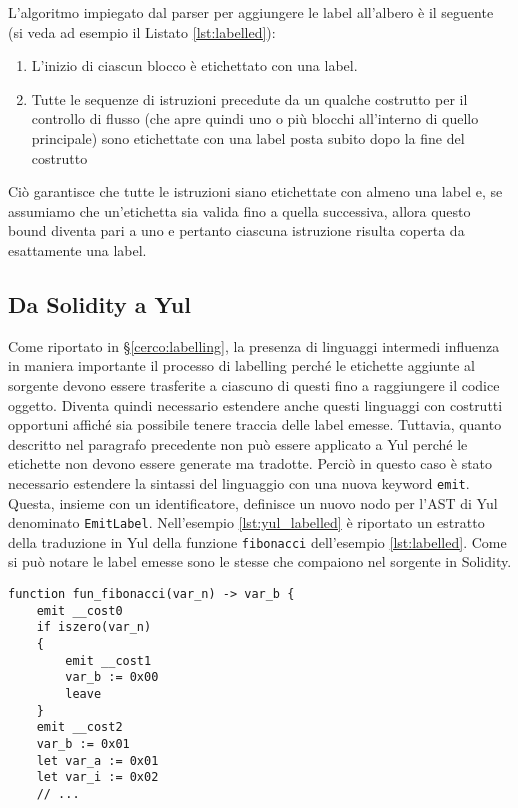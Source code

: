 \documentclass[12pt,a4paper,openright,oneside]{report}
\theoremstyle{definition}
\begin{document}
L'algoritmo impiegato dal parser per aggiungere le label all'albero \`{e} il seguente (si veda ad esempio il Listato \ref{lst:labelled}):
\begin{enumerate}
    \item L'inizio di ciascun blocco \`{e} etichettato con una label.
    \item Tutte le sequenze di istruzioni precedute da un qualche costrutto per il controllo di flusso (che apre quindi uno o pi\`{u} blocchi all'interno di quello principale) sono etichettate con una label posta subito dopo la fine del costrutto
\end{enumerate}
Ci\`{o} garantisce che tutte le istruzioni siano etichettate con almeno una label e, se assumiamo che un'etichetta sia valida fino a quella successiva, allora questo bound diventa pari a uno e pertanto ciascuna istruzione risulta coperta da esattamente una label.
\subsection{Da Solidity a Yul}\label{impl:lbl:yul}
Come riportato in \S\ref{cerco:labelling}, la presenza di linguaggi intermedi influenza in maniera importante il processo di labelling perch\'{e} le etichette aggiunte al sorgente devono essere trasferite a ciascuno di questi fino a raggiungere il codice oggetto. Diventa quindi necessario estendere anche questi linguaggi con costrutti opportuni affich\'{e} sia possibile tenere traccia delle label emesse. Tuttavia, quanto descritto nel paragrafo precedente non pu\`{o} essere applicato a Yul perch\'{e} le etichette non devono essere generate ma tradotte. Perci\`{o} in questo caso \`{e} stato necessario estendere la sintassi del linguaggio con una nuova keyword \texttt{emit}. Questa, insieme con un identificatore, definisce un nuovo nodo per l'AST di Yul denominato \texttt{EmitLabel}. Nell'esempio \ref{lst:yul_labelled} \`{e} riportato un estratto della traduzione in Yul della funzione \texttt{fibonacci} dell'esempio \ref{lst:labelled}. Come si pu\`{o} notare le label emesse sono le stesse che compaiono nel sorgente in Solidity.
\begin{lstlisting}[language=Solidity,caption=Esempio di codice etichettato in Yul,label={lst:yul_labelled},frame=tlrb]
function fun_fibonacci(var_n) -> var_b {
    emit __cost0
    if iszero(var_n)
    {
        emit __cost1
        var_b := 0x00
        leave
    }
    emit __cost2
    var_b := 0x01
    let var_a := 0x01
    let var_i := 0x02
    // ...
\end{lstlisting}
\end{document}
